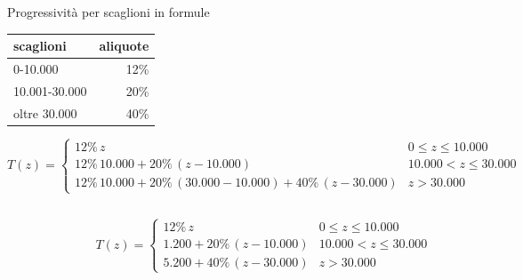 \documentclass[aspectratio=64,11pt]{beamer}
\newcommand\€{\,\text{€}}
\begin{document}
\begin{frame}{Progressività per scaglioni in formule}

  \centering
{}
%  
  \begin{tabular}[b]{lr}
\toprule scaglioni & aliquote \\ \midrule 
0-10.000 & 12\% \\ 
  10.001-30.000 & 20\% \\ 
  oltre 30.000 & 40\% \\
  \bottomrule
  \end{tabular}
  \hspace{3cm}

  \begin{equation*}
  T(z)=
  \begin{cases}
    12\%\, z & 0\le z\le10.000\\
    12\%\, 10.000 + 20\%\, (z-10.000) & 10.000<z\le30.000\\
    12\%\, 10.000 + 20\%\, (30.000-10.000) + 40\%\,(z-30.000) & z > 30.000
  \end{cases}
\end{equation*}

\begin{columns}
  \begin{column}{.25\textwidth}
    \hfill
{}
\end{column}
% 
\begin{column}{.6\textwidth}
  \begin{equation*}
  T(z)=
  \begin{cases}
    12\%\,z & 0\le z\le10.000\\
    1.200 + 20\%\,(z-10.000) & 10.000<z\le30.000\\
    5.200 + 40\%\,(z-30.000) & z > 30.000
  \end{cases}
\end{equation*}
\end{column}
\end{columns}
\end{frame}
\end{document}
